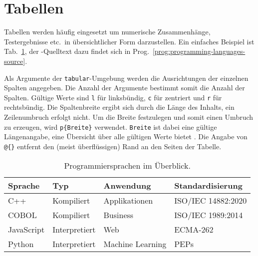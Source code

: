 \section{Tabellen}
\label{sec:tabellen}

Tabellen werden häufig eingesetzt um numerische Zusammenhänge, Testergebnisse
etc.\ in übersichtlicher Form darzustellen. Ein einfaches Beispiel ist
Tab.~\ref{tab:programming-languages}, der \latex-Quelltext dazu findet sich in
Prog.~\ref{prog:programming-languages-source}.

Als Argumente der \texttt{tabular}-Umgebung werden die Ausrichtungen der
einzelnen Spalten angegeben. Die Anzahl der Argumente bestimmt somit die
Anzahl der Spalten. Gültige Werte sind \texttt{l} für linksbündig, \texttt{c}
für zentriert und \texttt{r} für rechtsbündig. Die Spaltenbreite ergibt sich
durch die Länge des Inhalts, ein Zeilenumbruch erfolgt nicht. Um die Breite
festzulegen und somit einen Umbruch zu erzeugen, wird \verb|p{Breite}|
verwendet. \texttt{Breite} ist dabei eine gültige Längenangabe, eine
Übersicht über alle gültigen Werte bietet \cite{WikibooksLaTeXLengths2018}.
Die Angabe von \verb|@{}| entfernt den (meist überflüssigen) Rand an den
Seiten der Tabelle.

\begin{table}
	\caption{Programmiersprachen im Überblick.}
	\label{tab:programming-languages}
	\centering
	\setlength{\tabcolsep}{10pt} %
	\renewcommand{\arraystretch}{1.25} %
	\begin{tabular}{@{}llll@{}}
		\toprule
		Sprache    & Typ           & Anwendung        & Standardisierung   \\
		\midrule
		C++        & Kompiliert    & Applikationen    & ISO/IEC 14882:2020 \\
		COBOL      & Kompiliert    & Business         & ISO/IEC 1989:2014  \\
		JavaScript & Interpretiert & Web              & ECMA-262           \\
		Python     & Interpretiert & Machine Learning & PEPs               \\
		\bottomrule
	\end{tabular}
\end{table}

